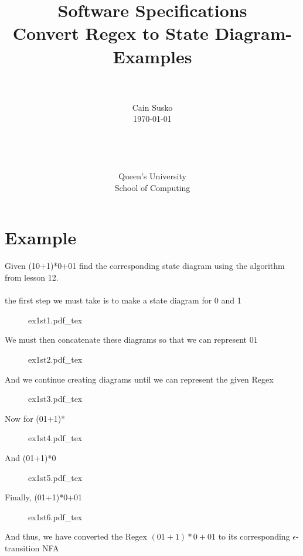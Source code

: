 \documentclass[12pt]{book}
\newcommand{\classID}{Convert Regex to State Diagram-Examples}
\newcommand{\coursename}{Software Specifications}
\newcommand{\incfig}[1]{%
    {#1.pdf_tex}
}
\begin{document}
\date{}
\setlength{\parindent}{0em}  %

\title{\coursename\\\classID}

\author{\\ \\ Cain Susko\\\today \\ \\ \\ \\ \\
        Queen's University \\School of Computing} 
 

\maketitle

\pagebreak

\section*{Example}
Given
(10+1)*0+01
find the corresponding state diagram using the algorithm from lesson 12.

\paragraph{}
the first step we must take is to make a state diagram for 0 and 1
\begin{figure}[h]
         \centering
         \incfig{ex1st1}
\end{figure}

We must then concatenate these diagrams so that we can represent $01$
 \begin{figure}[h]
        \centering
        \incfig{ex1st2}
\end{figure}

\pagebreak

And we continue creating diagrams until we can represent the given Regex\\
\begin{figure}[h]
        \centering
        \incfig{ex1st3}
\end{figure}

Now for (01+1)*
\begin{figure}[ht]
        \centering
        \incfig{ex1st4}
\end{figure}
\pagebreak

And (01+1)*0
\begin{figure}[ht]
        \centering
        \incfig{ex1st5}
\end{figure}

Finally, (01+1)*0+01
\begin{figure}[h]
        \centering
        \incfig{ex1st6}
\end{figure}

And thus, we have converted the Regex $\left( 01+1 \right)* 0+01$ to its corresponding $\epsilon$-transition NFA
\end{document}
